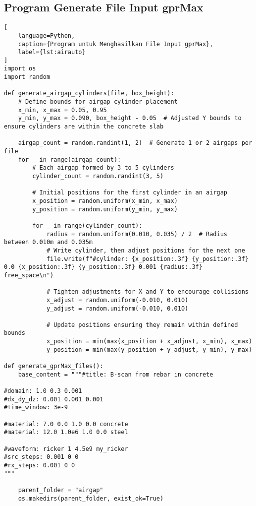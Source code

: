 \subsection*{Program Generate File Input gprMax}
\begin{lstlisting}[
    language=Python,
    caption={Program untuk Menghasilkan File Input gprMax},
    label={lst:airauto}
]
import os
import random

def generate_airgap_cylinders(file, box_height):
    # Define bounds for airgap cylinder placement
    x_min, x_max = 0.05, 0.95
    y_min, y_max = 0.090, box_height - 0.05  # Adjusted Y bounds to ensure cylinders are within the concrete slab
    
    airgap_count = random.randint(1, 2)  # Generate 1 or 2 airgaps per file
    for _ in range(airgap_count):
        # Each airgap formed by 3 to 5 cylinders
        cylinder_count = random.randint(3, 5)
        
        # Initial positions for the first cylinder in an airgap
        x_position = random.uniform(x_min, x_max)
        y_position = random.uniform(y_min, y_max)

        for _ in range(cylinder_count):
            radius = random.uniform(0.010, 0.035) / 2  # Radius between 0.010m and 0.035m
            # Write cylinder, then adjust positions for the next one
            file.write(f"#cylinder: {x_position:.3f} {y_position:.3f} 0.0 {x_position:.3f} {y_position:.3f} 0.001 {radius:.3f} free_space\n")
            
            # Tighten adjustments for X and Y to encourage collisions
            x_adjust = random.uniform(-0.010, 0.010)
            y_adjust = random.uniform(-0.010, 0.010)
            
            # Update positions ensuring they remain within defined bounds
            x_position = min(max(x_position + x_adjust, x_min), x_max)
            y_position = min(max(y_position + y_adjust, y_min), y_max)

def generate_gprMax_files():
    base_content = """#title: B-scan from rebar in concrete

#domain: 1.0 0.3 0.001
#dx_dy_dz: 0.001 0.001 0.001
#time_window: 3e-9

#material: 7.0 0.0 1.0 0.0 concrete
#material: 12.0 1.0e6 1.0 0.0 steel

#waveform: ricker 1 4.5e9 my_ricker
#src_steps: 0.001 0 0
#rx_steps: 0.001 0 0
"""

    parent_folder = "airgap"
    os.makedirs(parent_folder, exist_ok=True)


\end{lstlisting}
